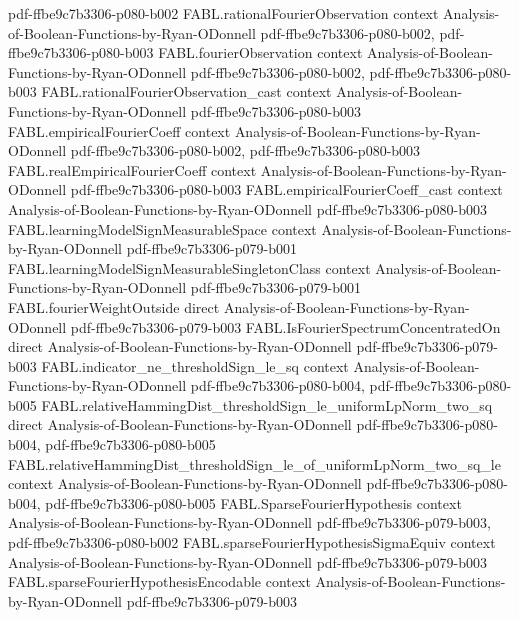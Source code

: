 \begin{theorem}
  {pdf-ffbe9c7b3306-p080-b002}
\proofstep
  {FABL.rationalFourierObservation}
  {context}
  {Analysis-of-Boolean-Functions-by-Ryan-ODonnell}
  {pdf-ffbe9c7b3306-p080-b002,
    pdf-ffbe9c7b3306-p080-b003}
\proofstep
  {FABL.fourierObservation}
  {context}
  {Analysis-of-Boolean-Functions-by-Ryan-ODonnell}
  {pdf-ffbe9c7b3306-p080-b002,
    pdf-ffbe9c7b3306-p080-b003}
\proofstep
  {FABL.rationalFourierObservation_cast}
  {context}
  {Analysis-of-Boolean-Functions-by-Ryan-ODonnell}
  {pdf-ffbe9c7b3306-p080-b003}
\proofstep
  {FABL.empiricalFourierCoeff}
  {context}
  {Analysis-of-Boolean-Functions-by-Ryan-ODonnell}
  {pdf-ffbe9c7b3306-p080-b002,
    pdf-ffbe9c7b3306-p080-b003}
\proofstep
  {FABL.realEmpiricalFourierCoeff}
  {context}
  {Analysis-of-Boolean-Functions-by-Ryan-ODonnell}
  {pdf-ffbe9c7b3306-p080-b003}
\proofstep
  {FABL.empiricalFourierCoeff_cast}
  {context}
  {Analysis-of-Boolean-Functions-by-Ryan-ODonnell}
  {pdf-ffbe9c7b3306-p080-b003}
\proofstep
  {FABL.learningModelSignMeasurableSpace}
  {context}
  {Analysis-of-Boolean-Functions-by-Ryan-ODonnell}
  {pdf-ffbe9c7b3306-p079-b001}
\proofstep
  {FABL.learningModelSignMeasurableSingletonClass}
  {context}
  {Analysis-of-Boolean-Functions-by-Ryan-ODonnell}
  {pdf-ffbe9c7b3306-p079-b001}
\proofstep
  {FABL.fourierWeightOutside}
  {direct}
  {Analysis-of-Boolean-Functions-by-Ryan-ODonnell}
  {pdf-ffbe9c7b3306-p079-b003}
\proofstep
  {FABL.IsFourierSpectrumConcentratedOn}
  {direct}
  {Analysis-of-Boolean-Functions-by-Ryan-ODonnell}
  {pdf-ffbe9c7b3306-p079-b003}
\proofstep
  {FABL.indicator_ne_thresholdSign_le_sq}
  {context}
  {Analysis-of-Boolean-Functions-by-Ryan-ODonnell}
  {pdf-ffbe9c7b3306-p080-b004,
    pdf-ffbe9c7b3306-p080-b005}
\proofstep
  {FABL.relativeHammingDist_thresholdSign_le_uniformLpNorm_two_sq}
  {direct}
  {Analysis-of-Boolean-Functions-by-Ryan-ODonnell}
  {pdf-ffbe9c7b3306-p080-b004,
    pdf-ffbe9c7b3306-p080-b005}
\proofstep
  {FABL.relativeHammingDist_thresholdSign_le_of_uniformLpNorm_two_sq_le}
  {context}
  {Analysis-of-Boolean-Functions-by-Ryan-ODonnell}
  {pdf-ffbe9c7b3306-p080-b004,
    pdf-ffbe9c7b3306-p080-b005}
\proofstep
  {FABL.SparseFourierHypothesis}
  {context}
  {Analysis-of-Boolean-Functions-by-Ryan-ODonnell}
  {pdf-ffbe9c7b3306-p079-b003,
    pdf-ffbe9c7b3306-p080-b002}
\proofstep
  {FABL.sparseFourierHypothesisSigmaEquiv}
  {context}
  {Analysis-of-Boolean-Functions-by-Ryan-ODonnell}
  {pdf-ffbe9c7b3306-p079-b003}
\proofstep
  {FABL.sparseFourierHypothesisEncodable}
  {context}
  {Analysis-of-Boolean-Functions-by-Ryan-ODonnell}
  {pdf-ffbe9c7b3306-p079-b003}

\end{theorem}
